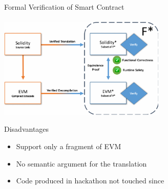 \begin{frame}{Formal Verification of Smart Contract}
\framesubtitle{\cite{bhargavan2016formal}}
\begin{center}
\includegraphics[width=0.6\textwidth]{./img/formal-verification-of-smart--contract.pdf}
\end{center}

\begin{block}{Disadvantages}
\begin{itemize}
\item Support only a fragment of EVM
\item No semantic argument for the translation
\item Code produced in hackathon not touched since
\end{itemize}
\end{block}
\end{frame}
